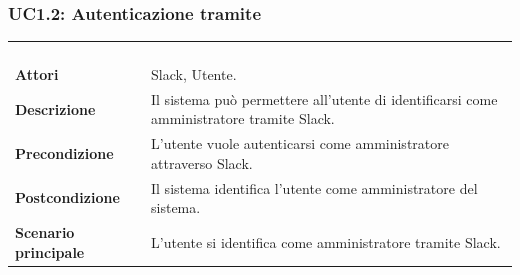 \subsubsection{UC1.2: Autenticazione tramite }
\label{UC1.2}
\begin{longtable}{l|p{10cm}}
\rowcolor[gray]{0.8} \multicolumn{2}{c}{} \\
\rowcolor[gray]{0.8} \multicolumn{2}{c}{\textbf{UC1.2 - Autenticazione tramite Slack}} \\
\rowcolor[gray]{0.8} \multicolumn{2}{c}{} \\
\hline
&\\
\textbf{Attori} & Slack, Utente.\\[7pt]
\textbf{Descrizione} & Il sistema può permettere all'utente di identificarsi come amministratore tramite Slack.\\[7pt]
\textbf{Precondizione} & L'utente vuole autenticarsi come amministratore attraverso Slack.\\[7pt]
\textbf{Postcondizione} & Il sistema identifica l'utente come amministratore del sistema.\\[7pt]
\textbf{Scenario principale} &L'utente si identifica come amministratore tramite Slack.\\[7pt]\hline
\end{longtable}

